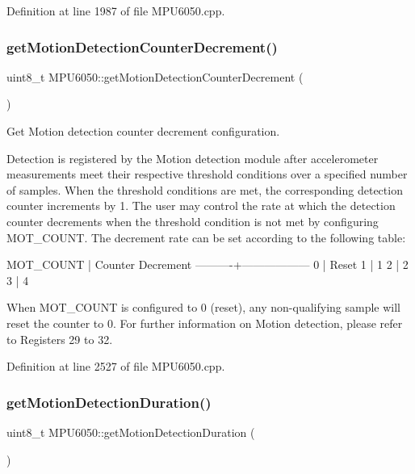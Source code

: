 Definition at line 1987 of file M\+P\+U6050.\+cpp.

\mbox{\label{classMPU6050_a0ed8de8eb440dbfdec829297527b0da6}} 
\subsubsection{\texorpdfstring{getMotionDetectionCounterDecrement()}{getMotionDetectionCounterDecrement()}}
{\footnotesize\ttfamily uint8\+\_\+t M\+P\+U6050\+::get\+Motion\+Detection\+Counter\+Decrement (\begin{DoxyParamCaption}{ }\end{DoxyParamCaption})}



Get Motion detection counter decrement configuration. 

Detection is registered by the Motion detection module after accelerometer measurements meet their respective threshold conditions over a specified number of samples. When the threshold conditions are met, the corresponding detection counter increments by 1. The user may control the rate at which the detection counter decrements when the threshold condition is not met by configuring M\+O\+T\+\_\+\+C\+O\+U\+NT. The decrement rate can be set according to the following table\+:


\begin{DoxyPre}
MOT\_COUNT | Counter Decrement
----------+------------------
0         | Reset
1         | 1
2         | 2
3         | 4
\end{DoxyPre}


When M\+O\+T\+\_\+\+C\+O\+U\+NT is configured to 0 (reset), any non-\/qualifying sample will reset the counter to 0. For further information on Motion detection, please refer to Registers 29 to 32. 

Definition at line 2527 of file M\+P\+U6050.\+cpp.

\mbox{\label{classMPU6050_a8ba035c2ae4a05d7e51b0d29e4924fb0}} 
\subsubsection{\texorpdfstring{getMotionDetectionDuration()}{getMotionDetectionDuration()}}
{\footnotesize\ttfamily uint8\+\_\+t M\+P\+U6050\+::get\+Motion\+Detection\+Duration (\begin{DoxyParamCaption}{ }\end{DoxyParamCaption})}



